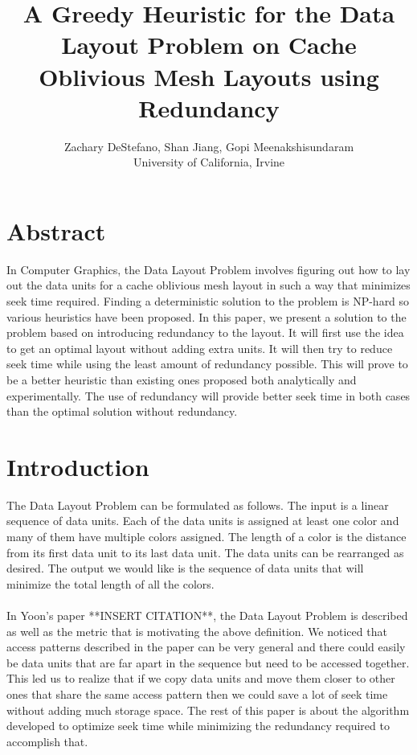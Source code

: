 \documentclass[11pt,psfig]{article}
\begin{document}
\setlength{\parskip}{1.2ex plus0.3ex minus 0.3ex}


\thispagestyle{empty} \pagestyle{myheadings} 



\title{A Greedy Heuristic for the Data Layout Problem on Cache Oblivious Mesh Layouts using Redundancy}
\author{Zachary DeStefano, Shan Jiang, Gopi Meenakshisundaram\\ University of California, Irvine}

\maketitle

\vfill\eject

\section*{Abstract}

In Computer Graphics, the Data Layout Problem involves figuring out how to lay out the data units for a cache oblivious mesh layout in such a way that minimizes seek time required. Finding a deterministic solution to the problem is NP-hard so various heuristics have been proposed. In this paper, we present a solution to the problem based on introducing redundancy to the layout. It will first use the idea to get an optimal layout without adding extra units. It will then try to reduce seek time while using the least amount of redundancy possible. This will prove to be a better heuristic than existing ones proposed both analytically and experimentally. The use of redundancy will provide better seek time in both cases than the optimal solution without redundancy.  

\section*{Introduction}

The Data Layout Problem can be formulated as follows. The input is a linear sequence of data units. Each of the data units is assigned at least one color and many of them have multiple colors assigned. The length of a color is the distance from its first data unit to its last data unit. The data units can be rearranged as desired. The output we would like is the sequence of data units that will minimize the total length of all the colors. \\
\\
In Yoon's paper **INSERT CITATION**, the Data Layout Problem is described as well as the metric that is motivating the above definition. We noticed that access patterns described in the paper can be very general and there could easily be data units that are far apart in the sequence but need to be accessed together. This led us to realize that if we copy data units and move them closer to other ones that share the same access pattern then we could save a lot of seek time without adding much storage space. The rest of this paper is about the algorithm developed to optimize seek time while minimizing the redundancy required to accomplish that. \\
\\
\end{document}
